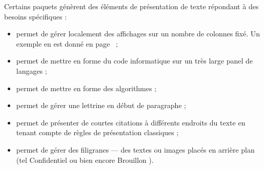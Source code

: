 Certains paquets génèrent des éléments de présentation de texte répondant à des besoins spécifiques :
\begin{itemize}
\item {} permet de gérer localement des affichages sur un nombre de colonnes fixé. Un exemple en est donné en page~\pageref{multicol} ;
\item {} permet de mettre en forme du code informatique sur un très large panel de langages ;
\item {} permet de mettre en forme des algorithmes ;
\item {} permet de gérer une lettrine en début de paragraphe ;
\item {} permet de présenter de courtes citations à différents endroits du texte en tenant compte de règles de présentation classiques ;
\item {} permet de gérer des filigranes  --- des textes ou images placés en arrière plan (tel \og Confidentiel \fg ou bien encore \og Brouillon \fg).
\end{itemize}